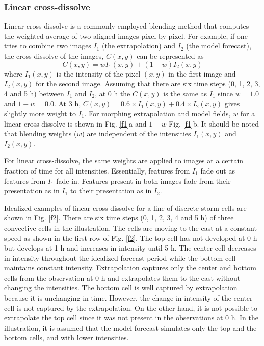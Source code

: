 \documentclass[12pt]{article}
\begin{document}
\subsubsection{Linear cross-dissolve}
Linear cross-dissolve is a commonly-employed blending method that computes the weighted average of two aligned images pixel-by-pixel. For example, if one tries to combine two images $I_{1}$ (the extrapolation) and $I_{2}$ (the model forecast), the cross-dissolve of the images, $C(x,y)$ can be represented as 
\begin{equation}
 C(x,y)=wI_{1}(x,y)+(1-w)I_{2}(x,y)
 \end{equation}
 where $I_{1}(x,y)$ is the intensity of the pixel $(x,y)$ in the first image and $I_{2}(x,y)$ for the second image. Assuming that there are six time steps (0, 1, 2, 3, 4 and 5 h) between $I_{1}$ and $I_{2}$, at 0 h the $C(x,y)$ is the same as $I_{1}$ since $w=1.0$ and $1-w=0.0$. At 3 h,  $C(x,y)=0.6 \times I_{1}(x,y)+0.4 \times I_{2}(x,y)$ gives slightly more weight to $I_{1}$. For morphing extrapolation and model fields, $w$ for a linear cross-dissolve is shown in Fig. \ref{f1}a and $1-w$ Fig. \ref{f1}b. It should be noted that blending weights ($w$) are independent of the intensities $I_{1}(x,y)$ and $I_{2}(x,y)$.
 
 For linear cross-dissolve, the same weights are applied to images at a certain fraction of time for all intensities. Essentially, features from $I_{1}$ fade out as features from $I_{1}$ fade in. Features present in both images fade from their presentation as in $I_{1}$ to their presentation as in $I_{2}$.
 
 Idealized examples of linear cross-dissolve for a line of discrete storm cells are shown in Fig. \ref{f2}. There are six time steps (0, 1, 2, 3, 4 and 5 h) of three convective cells in the illustration. The cells are moving to the east at a constant speed as shown in the first row of Fig. \ref{f2}. The top cell has not developed at 0 h but develops at 1 h and  increases in intensity until 5 h. The center cell decreases in intensity throughout the idealized forecast period while the bottom cell maintains constant intensity. Extrapolation captures only the center and bottom cells from the observation at 0 h and extrapolates them to the east without changing the intensities. The bottom cell is well captured by extrapolation because it is unchanging in time. However, the change in intensity of the center cell is not captured by the extrapolation. On the other hand, it is not possible to extrapolate the top cell since it was not present in the observations at 0 h. In the illustration, it is assumed that the model forecast simulates only the top and the bottom cells, and with lower intensities. 
\end{document}
